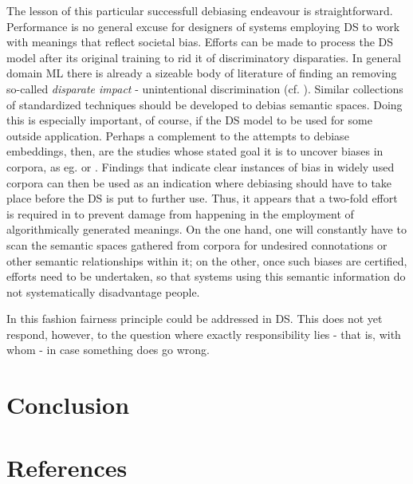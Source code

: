 \documentclass{article}
\begin{document}
The lesson of this particular successfull debiasing endeavour is straightforward. Performance is no general excuse for designers of systems employing DS to work with meanings that reflect societal bias. Efforts can be made to process the DS model after its original training to rid it of discriminatory disparaties. In general domain ML there is already a sizeable body of literature of finding an removing so-called \emph{disparate impact} - unintentional discrimination (cf. \cite{feldman2015certifying} \cite{dwork2012fairness}). 
Similar collections of standardized techniques should be developed to debias semantic spaces. Doing this is especially important, of course, if the DS model to be used for some outside application. 
Perhaps a complement to the attempts to debiase embeddings, then, are the studies whose stated goal it is to uncover biases in corpora, as eg. \cite{wagner2015s} or \cite{herbelot2012distributional}. Findings that indicate clear instances of bias in widely used corpora can then be used as an indication where  debiasing should have to take place before the DS is put to further use.
Thus, it appears that a two-fold effort is required in to prevent damage from happening in the employment of algorithmically generated meanings. On the one hand, one will constantly have to scan the semantic spaces gathered from corpora for undesired connotations or other semantic relationships within it; on the other, once such biases are certified, efforts need to be undertaken, so that systems using this semantic information do not systematically disadvantage people.

In this fashion fairness principle could be addressed in DS. This does not yet respond, however, to the question where exactly responsibility lies - that is, with whom - in case something does go wrong. 

\section{Conclusion}\hypertarget{sec x}{}

\section{References}\hypertarget{sec5}{ }
\end{document}

